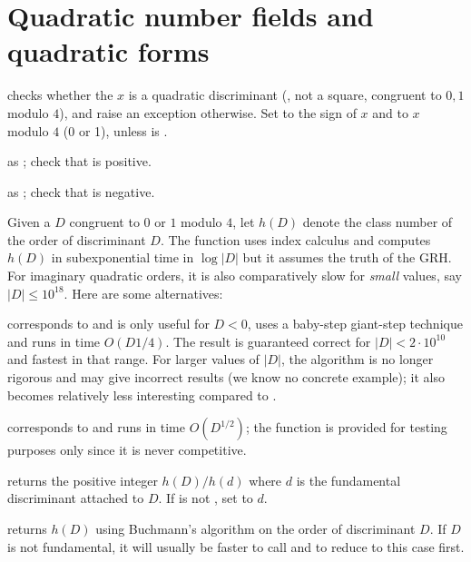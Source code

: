 \section{Quadratic number fields and quadratic forms}


checks whether the  $x$ is a quadratic discriminant (,
not a square, congruent to $0,1$ modulo $4$), and raise an exception
otherwise. Set  to the sign of $x$ and  to $x$ modulo
$4$ (0 or 1), unless  is .

 as
; check that  is positive.

 as
; check that  is negative.


Given a $D$ congruent to $0$ or $1$ modulo $4$, let $h(D)$ denote the class
number of the order of discriminant $D$.
The function  uses index calculus and computes $h(D)$ in
subexponential time in $\log |D|$ but it assumes the truth of the GRH. For
imaginary quadratic orders, it is also comparatively slow for \emph{small}
values, say $|D|\leq 10^{18}$. Here are some alternatives:

  corresponds to  and is only
useful for $D < 0$, uses a baby-step giant-step technique and runs in time
$O(D{1/4})$. The result is guaranteed correct for $|D| < 2\cdot 10^{10}$
and fastest in that range. For larger values of $|D|$, the algorithm is no
longer rigorous and may give incorrect results (we know no concrete example);
it also becomes relatively less interesting compared to .

  corresponds to  and runs in
time $O(D^{1/2})$; the function is provided for testing purposes only since
it is never competitive.

 returns the positive integer
$h(D)/h(d)$ where $d$ is the fundamental discriminant attached to $D$.
If  is not , set  to $d$.

 returns $h(D)$ using Buchmann's algorithm
on the order of discriminant $D$. If $D$ is not fundamental, it will
usually be faster to call  and
 to reduce to this case first.

